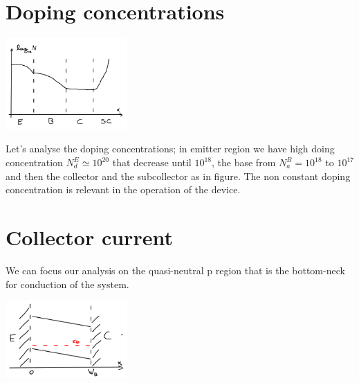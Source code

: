 \section{Doping concentrations}

\centering
\includegraphics[width=0.35\textwidth]{bjt2.png}\\
\raggedright

Let's analyse the doping concentrations; in emitter region we have high doing concentration $N_d^E\simeq 10^{20}$ that decrease until $10^{18}$, the base from $N_a^B=10^{18}$ to $10^{17}$ and then the collector and the subcollector as in figure. The non constant doping concentration is relevant in the operation of the device.\\
 
\section{Collector current}
We can focus our analysis on the quasi-neutral p region that is the bottom-neck for conduction of the system.

\centering
\includegraphics[width=0.35\textwidth]{bjt3.png}\\
\raggedright

